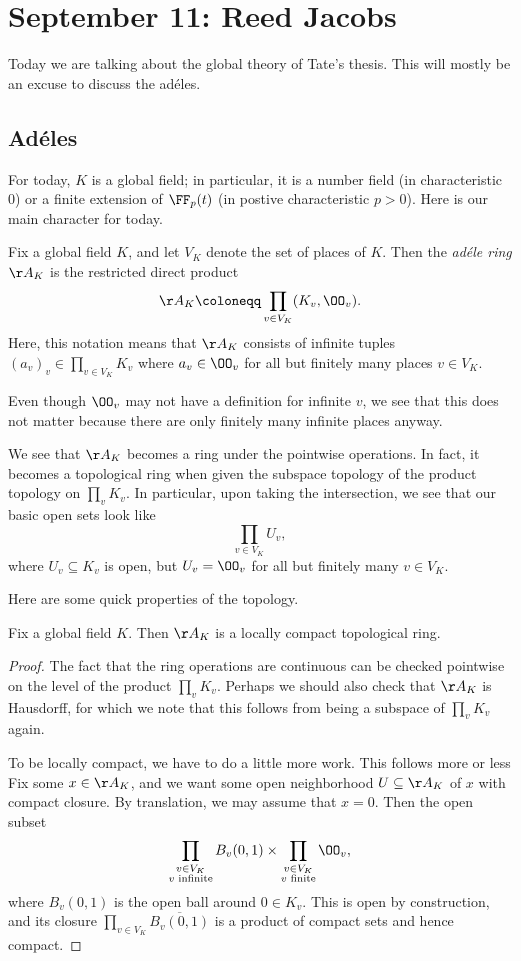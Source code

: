 \documentclass{article}
\begin{document}
\section{September 11: Reed Jacobs}
Today we are talking about the global theory of Tate's thesis. This will mostly be an excuse to discuss the ad\'eles.

\subsection{Ad\'eles}
For today, $K$ is a global field; in particular, it is a number field (in characteristic $0$) or a finite extension of $\FF_p(t)$ (in postive characteristic $p>0$). Here is our main character for today.
\begin{definition}
	Fix a global field $K$, and let $V_K$ denote the set of places of $K$. Then the \textit{ad\'ele ring $\AA_K$} is the restricted direct product
	\[\AA_K\coloneqq\prod_{v\in V_K}(K_v,\OO_v).\]
	Here, this notation means that $\AA_K$ consists of infinite tuples $(a_v)_v\in\prod_{v\in V_K}K_v$ where $a_v\in \OO_v$ for all but finitely many places $v\in V_K$.
\end{definition}
\begin{remark}
	Even though $\OO_v$ may not have a definition for infinite $v$, we see that this does not matter because there are only finitely many infinite places anyway.
\end{remark}
\begin{remark}
	We see that $\AA_K$ becomes a ring under the pointwise operations. In fact, it becomes a topological ring when given the subspace topology of the product topology on $\prod_vK_v$. In particular, upon taking the intersection, we see that our basic open sets look like
	\[\prod_{v\in V_K}U_v,\]
	where $U_v\subseteq K_v$ is open, but $U_v=\OO_v$ for all but finitely many $v\in V_K$.
\end{remark}
Here are some quick properties of the topology.
\begin{proposition}
	Fix a global field $K$. Then $\AA_K$ is a locally compact topological ring.
\end{proposition}
\begin{proof}
	The fact that the ring operations are continuous can be checked pointwise on the level of the product $\prod_vK_v$. Perhaps we should also check that $\AA_K$ is Hausdorff, for which we note that this follows from being a subspace of $\prod_vK_v$ again.
	
	To be locally compact, we have to do a little more work. This follows more or less  Fix some $x\in\AA_K$, and we want some open neighborhood $U\subseteq\AA_K$ of $x$ with compact closure. By translation, we may assume that $x=0$. Then the open subset
	\[\prod_{\substack{v\in V_K\\v\text{ infinite}}}B_v(0,1)\times\prod_{\substack{v\in V_K\\v\text{ finite}}}\OO_v,\]
	where $B_v(0,1)$ is the open ball around $0\in K_v$. This is open by construction, and its closure $\prod_{v\in V_K}\overline{B_v(0,1)}$ is a product of compact sets and hence compact.
\end{proof}
\end{document}
